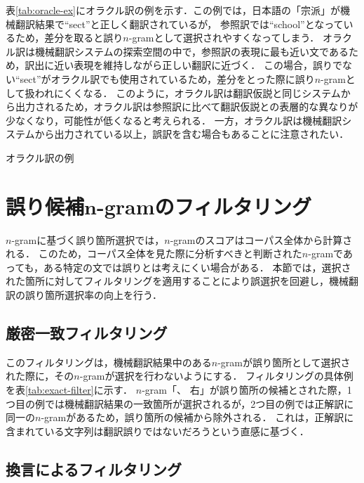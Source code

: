 \documentclass[japanese]{jnlp_1.4}
\newcommand{\textcolor}[2]{}
\begin{document}
表\ref{tab:oracle-ex}にオラクル訳の例を示す．この例では，日本語の「宗派」が機械翻訳結果で``sect''と正しく翻訳されているが，
参照訳では``school''となっているため，差分を取ると誤り$n$-gramとして選択されやすくなってしまう．
オラクル訳は機械翻訳システムの探索空間の中で，参照訳の表現に最も近い文であるため，訳出に近い表現を維持しながら正しい翻訳に近づく．
この場合，誤りでない``sect''がオラクル訳でも使用されているため，差分をとった際に誤り$n$-gramとして扱われにくくなる．
このように，オラクル訳は翻訳仮説と同じシステムから出力されるため，オラクル訳は参照訳に比べて翻訳仮説との表層的な異なりが少なくなり，\textcolor{black}{換言を誤り$n$-gramとして誤選択する}可能性が低くなると考えられる．
一方，オラクル訳は機械翻訳システムから出力されている以上，誤訳を含む場合もあることに注意されたい．

\begin{table}[t]
\caption{オラクル訳の例}
\label{tab:oracle-ex}

\end{table}


\section{誤り候補$\boldsymbol{n}$-gramのフィルタリング}
\label{sec:filtering}

$n$-gramに基づく誤り箇所選択では，$n$-gramのスコアはコーパス全体から計算される．
このため，コーパス全体を見た際に分析すべきと判断された$n$-gramであっても，ある特定の文では誤りとは考えにくい場合がある．
本節では，選択された箇所に対してフィルタリングを適用することにより誤選択を回避し，機械翻訳の誤り箇所選択率の向上を行う．


\subsection{厳密一致フィルタリング}

このフィルタリングは，機械翻訳結果中のある$n$-gramが誤り箇所として選択された際に，その$n$-gramが\textcolor{black}{正解訳の一部に厳密一致するかどうかを確認し，
一致する場合は}選択を行わないようにする．
フィルタリングの具体例を表\ref{tab:exact-filter}に示す．
$n$-gram「、 右」が誤り箇所の候補とされた際，1つ目の例では機械翻訳結果の一致箇所が選択されるが，2つ目の例では正解訳に同一の$n$-gramがあるため，誤り箇所の候補から除外される．
これは，正解訳に含まれている文字列は翻訳誤りではないだろうという直感に基づく．


\subsection{換言によるフィルタリング}
\end{document}
